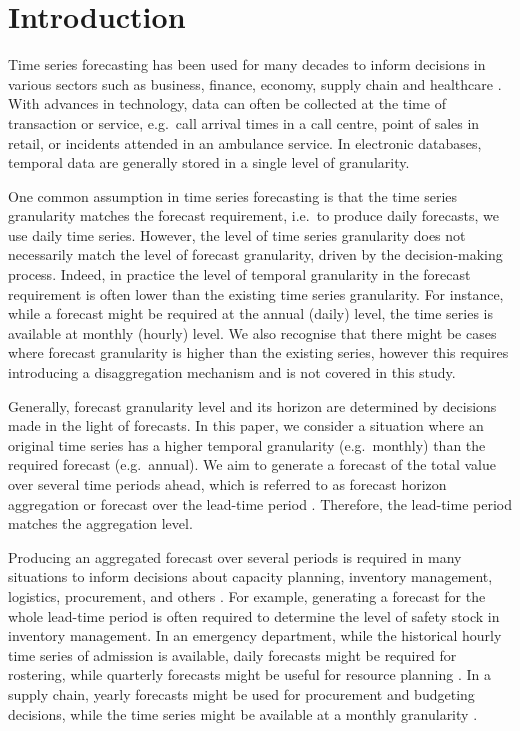\documentclass[preprint, 3p,
authoryear]{elsarticle} %
\begin{document}
\hypertarget{introduction}{%
\section{Introduction}\label{introduction}}

Time series forecasting has been used for many decades to inform
decisions in various sectors such as business, finance, economy, supply
chain and healthcare \citep{petropoulos2022forecasting}. With advances
in technology, data can often be collected at the time of transaction or
service, e.g.~call arrival times in a call centre, point of sales in
retail, or incidents attended in an ambulance service. In electronic
databases, temporal data are generally stored in a single level of
granularity.

One common assumption in time series forecasting is that the time series
granularity matches the forecast requirement, i.e.~to produce daily
forecasts, we use daily time series. However, the level of time series
granularity does not necessarily match the level of forecast
granularity, driven by the decision-making process. Indeed, in practice
the level of temporal granularity in the forecast requirement is often
lower than the existing time series granularity. For instance, while a
forecast might be required at the annual (daily) level, the time series
is available at monthly (hourly) level. We also recognise that there
might be cases where forecast granularity is higher than the existing
series, however this requires introducing a disaggregation mechanism and
is not covered in this study.

Generally, forecast granularity level and its horizon are determined by
decisions made in the light of forecasts. In this paper, we consider a
situation where an original time series has a higher temporal
granularity (e.g.~monthly) than the required forecast (e.g.~annual). We
aim to generate a forecast of the total value over several time periods
ahead, which is referred to as forecast horizon aggregation
\citep{mohammadipour2012forecast} or forecast over the lead-time period
\citep{rostami2023forecasting}. Therefore, the lead-time period matches
the aggregation level.

Producing an aggregated forecast over several periods is required in
many situations to inform decisions about capacity planning, inventory
management, logistics, procurement, and others
\citep{nikolopoulos2011aggregate, zotteri2007model}. For example,
generating a forecast for the whole lead-time period is often required
to determine the level of safety stock in inventory management. In an
emergency department, while the historical hourly time series of
admission is available, daily forecasts might be required for rostering,
while quarterly forecasts might be useful for resource planning
\citep{rostami2020anticipating}. In a supply chain, yearly forecasts
might be used for procurement and budgeting decisions, while the time
series might be available at a monthly granularity
\citep{mircetic2021forecasting}.
\end{document}
